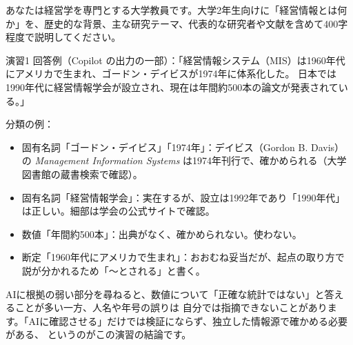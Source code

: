 \begin{promptbox}[経営情報の説明を求める]
あなたは経営学を専門とする大学教員です。大学2年生向けに「経営情報とは何か」を、歴史的な背景、主な研究テーマ、代表的な研究者や文献を含めて400字程度で説明してください。
\end{promptbox}




\begin{answer}{演習1}
回答例（Copilot の出力の一部）：「経営情報システム（MIS）は1960年代にアメリカで生まれ、ゴードン・デイビスが1974年に体系化した。
日本では1990年代に経営情報学会が設立され、現在は年間約500本の論文が発表されている。」

分類の例：
\begin{itemize}
  \item 固有名詞「ゴードン・デイビス」「1974年」：デイビス（Gordon B. Davis）の \textit{Management Information Systems}
        は1974年刊行で、確かめられる（大学図書館の蔵書検索で確認）。
  \item 固有名詞「経営情報学会」：実在するが、設立は1992年であり「1990年代」は正しい。細部は学会の公式サイトで確認。
  \item 数値「年間約500本」：出典がなく、確かめられない。使わない。
  \item 断定「1960年代にアメリカで生まれ」：おおむね妥当だが、起点の取り方で説が分かれるため「〜とされる」と書く。
\end{itemize}
AIに根拠の弱い部分を尋ねると、数値について「正確な統計ではない」と答えることが多い一方、人名や年号の誤りは
自分では指摘できないことがあります。「AIに確認させる」だけでは検証にならず、独立した情報源で確かめる必要がある、
というのがこの演習の結論です。
\end{answer}

